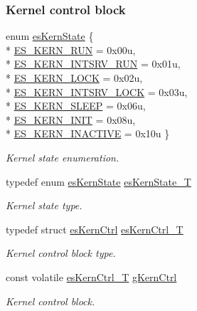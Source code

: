 \subsubsection*{Kernel control block}
\begin{DoxyCompactItemize}
\item 
enum \hyperlink{group__kern__intf_gac9be6bfeddbd6af148cdb3867fbc24af}{es\-Kern\-State} \{ \\*
\hyperlink{group__kern__intf_ggac9be6bfeddbd6af148cdb3867fbc24afa31a7e1ee10bcd82aaf8f5eca06ecdbe8}{E\-S\-\_\-\-K\-E\-R\-N\-\_\-\-R\-U\-N} = 0x00u, 
\\*
\hyperlink{group__kern__intf_ggac9be6bfeddbd6af148cdb3867fbc24afa62e34103bea61ea0b7a9816180a43905}{E\-S\-\_\-\-K\-E\-R\-N\-\_\-\-I\-N\-T\-S\-R\-V\-\_\-\-R\-U\-N} = 0x01u, 
\\*
\hyperlink{group__kern__intf_ggac9be6bfeddbd6af148cdb3867fbc24afa4e5b5c809ea9cdbae536b701003278cc}{E\-S\-\_\-\-K\-E\-R\-N\-\_\-\-L\-O\-C\-K} = 0x02u, 
\\*
\hyperlink{group__kern__intf_ggac9be6bfeddbd6af148cdb3867fbc24afa2b35c503975df4c289e9cbff3e815f8b}{E\-S\-\_\-\-K\-E\-R\-N\-\_\-\-I\-N\-T\-S\-R\-V\-\_\-\-L\-O\-C\-K} = 0x03u, 
\\*
\hyperlink{group__kern__intf_ggac9be6bfeddbd6af148cdb3867fbc24afad45a94c8b4975fd162d683201a75cceb}{E\-S\-\_\-\-K\-E\-R\-N\-\_\-\-S\-L\-E\-E\-P} = 0x06u, 
\\*
\hyperlink{group__kern__intf_ggac9be6bfeddbd6af148cdb3867fbc24afacad35dc43528f96d27696db584f05cff}{E\-S\-\_\-\-K\-E\-R\-N\-\_\-\-I\-N\-I\-T} = 0x08u, 
\\*
\hyperlink{group__kern__intf_ggac9be6bfeddbd6af148cdb3867fbc24afa089165cac55f315953335f5ffe41b7c4}{E\-S\-\_\-\-K\-E\-R\-N\-\_\-\-I\-N\-A\-C\-T\-I\-V\-E} = 0x10u
 \}
\begin{DoxyCompactList}\small\item\em Kernel state enumeration. \end{DoxyCompactList}\item 
typedef enum \hyperlink{group__kern__intf_gac9be6bfeddbd6af148cdb3867fbc24af}{es\-Kern\-State} \hyperlink{group__kern__intf_gab5edef44fe53303f96dc5e9f567babaf}{es\-Kern\-State\-\_\-\-T}
\begin{DoxyCompactList}\small\item\em Kernel state type. \end{DoxyCompactList}\item 
typedef struct \hyperlink{structesKernCtrl}{es\-Kern\-Ctrl} \hyperlink{group__kern__intf_gaae54a9918d92a2105b1d331b083d21b7}{es\-Kern\-Ctrl\-\_\-\-T}
\begin{DoxyCompactList}\small\item\em Kernel control block type. \end{DoxyCompactList}\item 
const volatile \hyperlink{group__kern__intf_gaae54a9918d92a2105b1d331b083d21b7}{es\-Kern\-Ctrl\-\_\-\-T} \hyperlink{group__kern__intf_ga299ac766f155bf1ef931627e2a0b895b}{g\-Kern\-Ctrl}
\begin{DoxyCompactList}\small\item\em Kernel control block. \end{DoxyCompactList}\end{DoxyCompactItemize}
